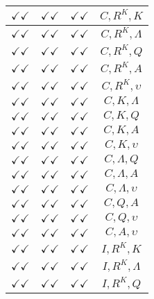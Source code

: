 \documentclass[a4paper,10pt]{article}
\begin{document}
\begin{longtable}{|c|c|c|c|}
\hline
$\checkmark\checkmark$ & $\checkmark\checkmark$ & $\checkmark\checkmark$ & ${C},{R^{K}},{K}$ \\
\hline
$\checkmark\checkmark$ & $\checkmark\checkmark$ & $\checkmark\checkmark$ & ${C},{R^{K}},{\Lambda}$ \\
\hline
$\checkmark\checkmark$ & $\checkmark\checkmark$ & $\checkmark\checkmark$ & ${C},{R^{K}},{Q}$ \\
\hline
$\checkmark\checkmark$ & $\checkmark\checkmark$ & $\checkmark\checkmark$ & ${C},{R^{K}},{A}$ \\
\hline
$\checkmark\checkmark$ & $\checkmark\checkmark$ & $\checkmark\checkmark$ & ${C},{R^{K}},{\upsilon}$ \\
\hline
$\checkmark\checkmark$ & $\checkmark\checkmark$ & $\checkmark\checkmark$ & ${C},{K},{\Lambda}$ \\
\hline
$\checkmark\checkmark$ & $\checkmark\checkmark$ & $\checkmark\checkmark$ & ${C},{K},{Q}$ \\
\hline
$\checkmark\checkmark$ & $\checkmark\checkmark$ & $\checkmark\checkmark$ & ${C},{K},{A}$ \\
\hline
$\checkmark\checkmark$ & $\checkmark\checkmark$ & $\checkmark\checkmark$ & ${C},{K},{\upsilon}$ \\
\hline
$\checkmark\checkmark$ & $\checkmark\checkmark$ & $\checkmark\checkmark$ & ${C},{\Lambda},{Q}$ \\
\hline
$\checkmark\checkmark$ & $\checkmark\checkmark$ & $\checkmark\checkmark$ & ${C},{\Lambda},{A}$ \\
\hline
$\checkmark\checkmark$ & $\checkmark\checkmark$ & $\checkmark\checkmark$ & ${C},{\Lambda},{\upsilon}$ \\
\hline
$\checkmark\checkmark$ & $\checkmark\checkmark$ & $\checkmark\checkmark$ & ${C},{Q},{A}$ \\
\hline
$\checkmark\checkmark$ & $\checkmark\checkmark$ & $\checkmark\checkmark$ & ${C},{Q},{\upsilon}$ \\
\hline
$\checkmark\checkmark$ & $\checkmark\checkmark$ & $\checkmark\checkmark$ & ${C},{A},{\upsilon}$ \\
\hline
$\checkmark\checkmark$ & $\checkmark\checkmark$ & $\checkmark\checkmark$ & ${I},{R^{K}},{K}$ \\
\hline
$\checkmark\checkmark$ & $\checkmark\checkmark$ & $\checkmark\checkmark$ & ${I},{R^{K}},{\Lambda}$ \\
\hline
$\checkmark\checkmark$ & $\checkmark\checkmark$ & $\checkmark\checkmark$ & ${I},{R^{K}},{Q}$ \\

\end{longtable}
\end{document}
